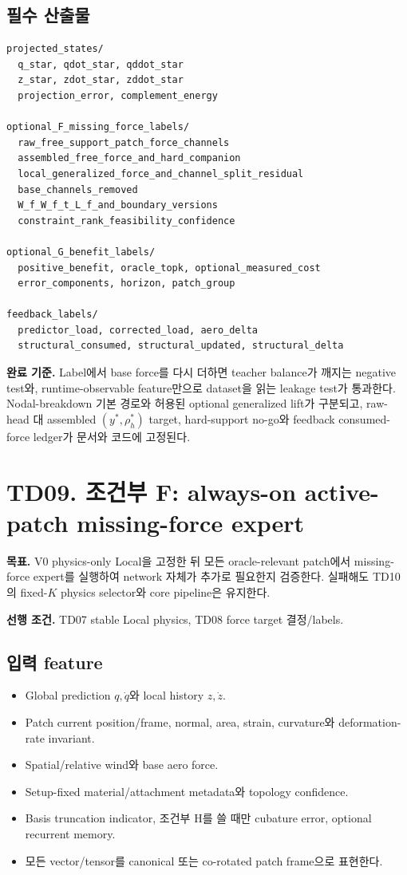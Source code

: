 \documentclass[10pt,a4paper]{article}
\newcommand{\todo}{\textcolor{TodoGray}{\(\square\)}}
\begin{document}
\subsection*{필수 산출물}

\begin{lstlisting}
projected_states/
  q_star, qdot_star, qddot_star
  z_star, zdot_star, zddot_star
  projection_error, complement_energy

optional_F_missing_force_labels/
  raw_free_support_patch_force_channels
  assembled_free_force_and_hard_companion
  local_generalized_force_and_channel_split_residual
  base_channels_removed
  W_f_W_f_t_L_f_and_boundary_versions
  constraint_rank_feasibility_confidence

optional_G_benefit_labels/
  positive_benefit, oracle_topk, optional_measured_cost
  error_components, horizon, patch_group

feedback_labels/
  predictor_load, corrected_load, aero_delta
  structural_consumed, structural_updated, structural_delta
\end{lstlisting}

\textbf{완료 기준.}
Label에서 base force를 다시 더하면 teacher balance가 깨지는 negative test와,
runtime-observable feature만으로 dataset을 읽는 leakage test가 통과한다.
Nodal-breakdown 기본 경로와 허용된 optional generalized lift가 구분되고,
raw-head 대 assembled \((y^*,\rho_h^*)\) target, hard-support no-go와
feedback consumed-force ledger가 문서와 코드에 고정된다.

\section{TD09. 조건부 F: always-on active-patch missing-force expert}

\textbf{목표.}
V0 physics-only Local을 고정한 뒤 모든 oracle-relevant patch에서 missing-force expert를 실행하여
network 자체가 추가로 필요한지 검증한다. 실패해도 TD10의 fixed-\(K\) physics selector와 core pipeline은 유지한다.

\textbf{선행 조건.} TD07 stable Local physics, TD08 force target 결정/labels.

\subsection*{입력 feature}

\begin{itemize}
  \item[\todo] Global prediction \(q,\dot q\)와 local history \(z,\dot z\).
  \item[\todo] Patch current position/frame, normal, area, strain, curvature와 deformation-rate invariant.
  \item[\todo] Spatial/relative wind와 base aero force.
  \item[\todo] Setup-fixed material/attachment metadata와 topology confidence.
  \item[\todo] Basis truncation indicator, 조건부 H를 쓸 때만 cubature error, optional recurrent memory.
  \item[\todo] 모든 vector/tensor를 canonical 또는 co-rotated patch frame으로 표현한다.
\end{itemize}
\end{document}
